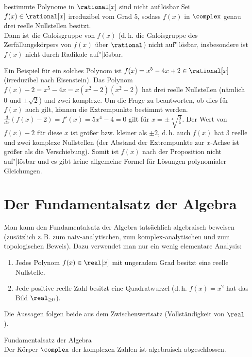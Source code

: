 \linie

\begin{Prop}{bestimmte Polynome in $\rational[x]$ sind nicht auf\,\!lösbar}
    Sei $f(x) \in \rational[x]$ irreduzibel vom Grad $5$, sodass
    $f(x)$ in $\complex$ genau drei reelle Nullstellen besitzt.\\
    Dann ist die Galoisgruppe von $f(x)$
    (d.\,h. die Galoisgruppe des Zerfällungskörpers von $f(x)$ über
    $\rational$)
    nicht auf"|lösbar,
    insbesondere ist $f(x)$ nicht durch Radikale auf"|lösbar.
\end{Prop}

\begin{Bem}
    Ein Beispiel für ein solches Polynom ist
    $f(x) = x^5 - 4x + 2 \in \rational[x]$
    (irreduzibel nach Eisenstein).
    Das Polynom $f(x) - 2 = x^5 - 4x = x(x^2 - 2)(x^2 + 2)$ hat
    drei reelle Nullstellen (nämlich $0$ und $\pm\sqrt{2}$) und
    zwei komplexe.
    Um die Frage zu beantworten, ob dies für $f(x)$ auch gilt, können die
    Extrempunkte bestimmt werden.
    $\frac{d}{dx}(f(x) - 2) = f'(x) = 5x^4 - 4 = 0$ gilt für
    $x = \pm\sqrt[4]{\frac{4}{5}}$.
    Der Wert von $f(x) - 2$ für diese $x$ ist größer bzw. kleiner als
    $\pm 2$,
    d.\,h. auch $f(x)$ hat $3$ reelle und zwei komplexe Nullstellen
    (der Abstand der Extrempunkte zur $x$-Achse ist größer als die
    Verschiebung).
    Somit ist $f(x)$ nach der Proposition nicht auf"|lösbar und
    es gibt keine allgemeine Formel für Lösungen polynomialer Gleichungen.
\end{Bem}

\section{%
    Der Fundamentalsatz der Algebra%
}

\begin{Bem}
    Man kann den Fundamentalsatz der Algebra tatsächlich algebraisch beweisen
    (zusätzlich z.\,B. zum naiv-analytischen, zum
    komplex-analytischen und zum topologischen Beweis).
    Dazu verwendet man nur ein wenig elementare Analysis:
    \begin{enumerate}[label=(\alph*)]
        \item
        Jedes Polynom $f(x) \in \real[x]$ mit ungeradem Grad besitzt
        eine reelle Nullstelle.

        \item
        Jede positive reelle Zahl besitzt eine Quadratwurzel
        (d.\,h. $f(x) = x^2$ hat das Bild $\real_{\ge 0}$).
    \end{enumerate}
    Die Aussagen folgen beide aus dem Zwischenwertsatz
    (Vollständigkeit von $\real$).
\end{Bem}

\begin{Theorem}{Fundamentalsatz der Algebra}\\
    Der Körper $\complex$ der komplexen Zahlen ist algebraisch abgeschlossen.
\end{Theorem}

\pagebreak
